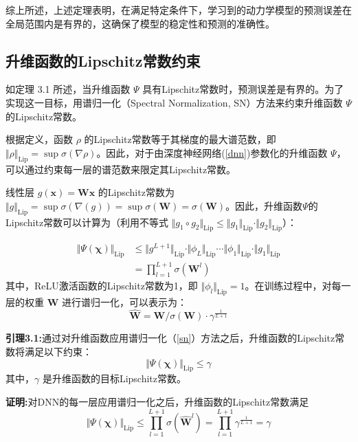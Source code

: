 \documentclass[lang=chs, degree=master, blindreview=false, winfonts=true]{yanputhesis}
\begin{document}
综上所述，上述定理表明，在满足特定条件下，学习到的动力学模型的预测误差在全局范围内是有界的，这确保了模型的稳定性和预测的准确性。

\subsection{升维函数的Lipschitz常数约束}

如定理 3.1 所述，当升维函数 $\Psi$ 具有Lipschitz常数时，预测误差是有界的。为了实现这一目标，用谱归一化（Spectral Normalization, SN）方法来约束升维函数 ${\Psi}$ 的Lipschitz常数。

根据定义，函数 $\rho$ 的Lipschitz常数等于其梯度的最大谱范数，即 $\Vert \rho \Vert_{\text{Lip}} = \sup \sigma (\nabla \rho)$。因此，对于由深度神经网络(\ref{dnn})参数化的升维函数 ${\Psi}$，可以通过约束每一层的谱范数来限定其Lipschitz常数。

线性层 $g(\bm{x})=\bm{W}\bm{x}$ 的Lipschitz常数为 $\Vert g \Vert_{\text{Lip}} = \sup \sigma(\nabla(g))=\sup \sigma(\bm{W})=\sigma(\bm{W})$。因此，升维函数${\Psi}$的Lipschitz常数可以计算为（利用不等式 $\Vert g_1 \circ g_2 \Vert_{\text{Lip}} \le \Vert g_1 \Vert_{\text{Lip}}\cdot \Vert g_2 \Vert_{\text{Lip}}$）：

\begin{equation}
    \begin{aligned}
	\Vert {\Psi}(\bm{\chi}) \Vert_{\text{Lip}} &\le \Vert g^{L+1} \Vert_{\text{Lip}} \cdot \Vert \phi_L \Vert_{\text{Lip}} \cdots \Vert \phi_1 \Vert_{\text{Lip}} \cdot \Vert g_1 \Vert_{\text{Lip}} \\
	&= \prod_{l=1}^{L+1}\sigma(\bm{W}^l)
\end{aligned}
\end{equation}
其中，ReLU激活函数的Lipschitz常数为1，即 $\Vert \phi_l \Vert_{\text{Lip}} = 1$。在训练过程中，对每一层的权重 $\bm{W}$ 进行谱归一化，可以表示为：
\begin{equation}
    \hat{\bm{W}} = \bm{W} / \sigma(\bm{W}) \cdot \gamma ^{\frac{1}{L+1}}  
	\label{sn}
\end{equation}

\textbf{引理3.1:}通过对升维函数应用谱归一化（\ref{sn}）方法之后，升维函数的Lipschitz常数将满足以下约束：
\begin{equation}
	\Vert {\Psi}(\bm{\chi}) \Vert_{\text{Lip}}\le \gamma
\end{equation}
	其中，$\gamma$ 是升维函数的目标Lipschitz常数。

\textbf{证明:}对DNN的每一层应用谱归一化之后，升维函数的Lipschitz常数满足
\begin{equation}
	\Vert {\Psi}(\bm{\chi}) \Vert_{\text{Lip}} \le \prod_{l=1}^{L+1}\sigma(\hat{\bm{W}}^l) = \prod_{l=1}^{L+1}\gamma^{\frac{1}{L+1}}=\gamma
\end{equation}
\end{document}
